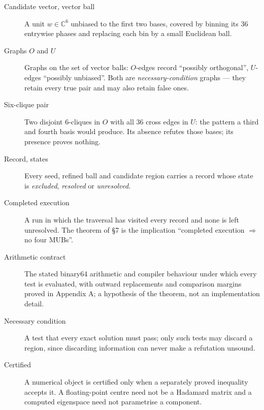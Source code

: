 \documentclass[11pt]{article}
\newcommand{\C}{\mathbb{C}}
\newcommand{\grp}[1]{\par\medskip\noindent{\normalsize\bfseries #1}\par\nobreak\vspace{-1pt}}
\begin{document}
\grp{6.\ Stage C and the execution}

\begin{description}
\item[Candidate vector, vector ball] A unit $w\in\C^6$ unbiased to the first two bases, covered by
binning its $36$ entrywise phases and replacing each bin by a small Euclidean ball.
\item[Graphs $O$ and $U$] Graphs on the set of vector balls: $O$-edges record ``possibly orthogonal'',
$U$-edges ``possibly unbiased''. Both are \emph{necessary-condition} graphs --- they retain every true
pair and may also retain false ones.
\item[Six-clique pair] Two disjoint $6$-cliques in $O$ with all $36$ cross edges in $U$: the pattern a
third and fourth basis would produce. Its absence refutes those bases; its presence proves nothing.
\item[Record, states] Every seed, refined ball and candidate region carries a record whose state is
\emph{excluded}, \emph{resolved} or \emph{unresolved}.
\item[Completed execution] A run in which the traversal has visited every record and none is left
unresolved. The theorem of \S7 is the implication ``completed execution $\Rightarrow$ no four MUBs''.
\item[Arithmetic contract] The stated binary64 arithmetic and compiler behaviour under which every test
is evaluated, with outward replacements and comparison margins proved in Appendix A; a hypothesis of
the theorem, not an implementation detail.
\item[Necessary condition] A test that every exact solution must pass; only such tests may discard a
region, since discarding information can never make a refutation unsound.
\item[Certified] A numerical object is certified only when a separately proved inequality accepts it. A
floating-point centre need not be a Hadamard matrix and a computed eigenspace need not parametrise a
component.
\end{description}
\end{document}
